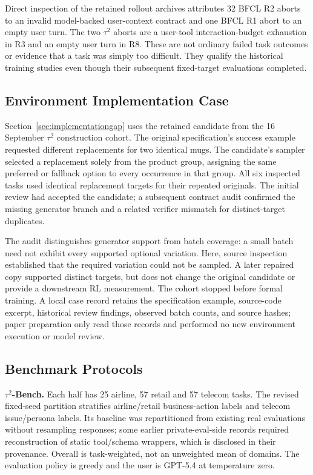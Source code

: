 Direct inspection of the retained rollout archives attributes 32 BFCL R2 aborts to an invalid model-backed user-context contract and one BFCL R1 abort to an empty user turn. The two $\tau^2$ aborts are a user-tool interaction-budget exhaustion in R3 and an empty user turn in R8. These are not ordinary failed task outcomes or evidence that a task was simply too difficult. They qualify the historical training studies even though their subsequent fixed-target evaluations completed.

\subsection{Environment Implementation Case}
\label{app:implementationaudit}

Section~\ref{sec:implementationgap} uses the retained 
candidate from the 16 September $\tau^2$ construction cohort. The original
specification's success example requested different replacements for two
identical mugs. The candidate's sampler selected a replacement solely from
the product group, assigning the same preferred or fallback option to every
occurrence in that group. All six inspected tasks used identical replacement
targets for their repeated originals. The initial review had accepted the
candidate; a subsequent contract audit confirmed the missing generator branch
and a related verifier mismatch for distinct-target duplicates.

The audit distinguishes generator support from batch coverage: a small batch
need not exhibit every supported optional variation. Here, source inspection
established that the required variation could not be sampled. A later repaired
copy supported distinct targets, but does not change the original candidate
or provide a downstream RL measurement. The cohort stopped before formal
training. A local case record retains the specification example, source-code
excerpt, historical review findings, observed batch counts, and source hashes;
paper preparation only read those records and performed no new environment
execution or model review.

\subsection{Benchmark Protocols}

\textbf{$\tau^2$-Bench.}\quad
Each half has 25 airline, 57 retail and 57 telecom tasks. The revised fixed-seed partition stratifies airline/retail business-action labels and telecom issue/persona labels. Its baseline was repartitioned from existing real evaluations without resampling responses; some earlier private-eval-side records required reconstruction of static tool/schema wrappers, which is disclosed in their provenance. Overall is task-weighted, not an unweighted mean of domains. The evaluation policy is greedy and the user is GPT-5.4 at temperature zero.

